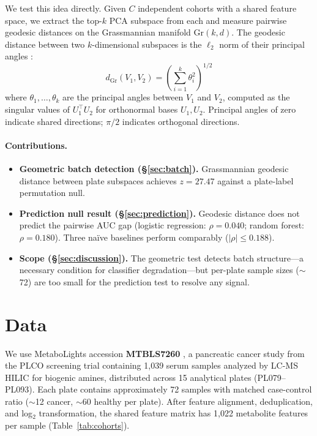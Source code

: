 \documentclass{article}
\begin{document}
We test this idea directly. Given $C$ independent cohorts with a shared feature space, we extract the top-$k$ PCA subspace from each and measure pairwise geodesic distances on the Grassmannian manifold $\mathrm{Gr}(k, d)$. The geodesic distance between two $k$-dimensional subspaces is the $\ell_2$ norm of their principal angles \citep{bjorck1973numerical, ye2016schubert}:
\begin{equation}
d_{\mathrm{Gr}}(V_1, V_2) = \left(\sum_{i=1}^{k} \theta_i^2\right)^{1/2}
\end{equation}
where $\theta_1, \ldots, \theta_k$ are the principal angles between $V_1$ and $V_2$, computed as the singular values of $U_1^\top U_2$ for orthonormal bases $U_1, U_2$. Principal angles of zero indicate shared directions; $\pi/2$ indicates orthogonal directions.

\paragraph{Contributions.}
\begin{itemize}
\item \textbf{Geometric batch detection (\S\ref{sec:batch}).} Grassmannian geodesic distance between plate subspaces achieves $z = 27.47$ against a plate-label permutation null.
\item \textbf{Prediction null result (\S\ref{sec:prediction}).} Geodesic distance does not predict the pairwise AUC gap (logistic regression: $\rho = 0.040$; random forest: $\rho = 0.180$). Three na\"{i}ve baselines perform comparably ($|\rho| \leq 0.188$).
\item \textbf{Scope (\S\ref{sec:discussion}).} The geometric test detects batch structure---a necessary condition for classifier degradation---but per-plate sample sizes ($\sim$72) are too small for the prediction test to resolve any signal.
\end{itemize}


\section{Data}

We use MetaboLights accession \textbf{MTBLS7260} \citep{leonletelier2024contributions}, a pancreatic cancer study from the PLCO screening trial containing 1{,}039 serum samples analyzed by LC-MS HILIC for biogenic amines, distributed across 15 analytical plates (PL079--PL093). Each plate contains approximately 72 samples with matched case-control ratio ($\sim$12 cancer, $\sim$60 healthy per plate). After feature alignment, deduplication, and log$_2$ transformation, the shared feature matrix has 1{,}022 metabolite features per sample (Table~\ref{tab:cohorts}).
\end{document}

